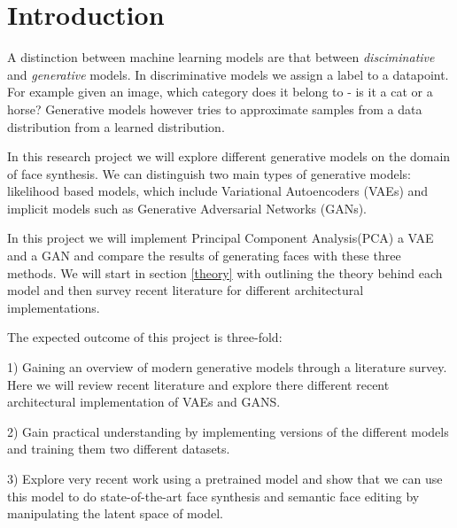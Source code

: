 \section{Introduction}

A distinction between machine learning models are that between \emph{disciminative} and \emph{generative} models. In discriminative models we assign a label to a datapoint. For example given an image, which category does it belong to - is it a cat or a horse? Generative models however tries to approximate samples from a data distribution from a learned distribution.

In this research project we will explore different generative models on the domain of face synthesis. We can distinguish two main types of generative models: likelihood based models, which include Variational Autoencoders (VAEs) and implicit models such as Generative Adversarial Networks (GANs)\cite{vqvae2}.

In this project we will implement Principal Component Analysis(PCA) a VAE and a GAN and compare the results of generating faces with these three methods. We will start in section \ref{theory} with outlining the theory behind each model and  then survey recent literature for different architectural implementations.

The expected outcome of this project is three-fold:

1) Gaining an overview of modern generative models through a literature survey. Here we will review recent literature and explore there different recent architectural implementation of VAEs and GANS.

2) Gain practical understanding by implementing versions of the different models and training them two different datasets.

3) Explore very recent work using  a pretrained model and show that we can use this model to do state-of-the-art face synthesis and semantic face editing by manipulating the latent space of model.

